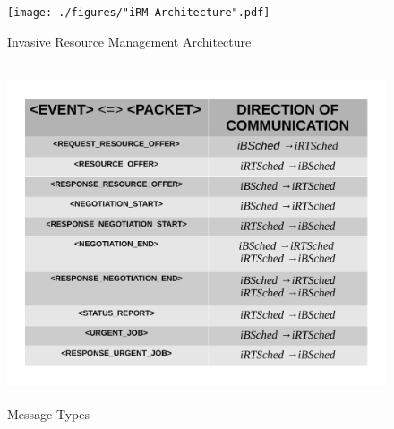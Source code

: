 \begin{figure}[!htbp]
\centering
\texttt{[image: ./figures/"iRM Architecture".pdf]}
\caption{Invasive Resource Management Architecture}
\label{fig:7}
\end{figure}
\begin{figure}[h]
\centering
\includegraphics[width=1.0\textwidth, height=100mm]{./figures/table.pdf}
\caption{Message Types}
\label{fig:8}
\end{figure}

